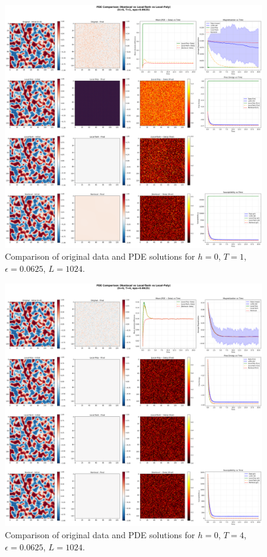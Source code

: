 \documentclass[11pt,a4paper]{article}
\begin{document}

\begin{figure}[!h]
    \centering
    \includegraphics[width=1.0\textwidth]{fig/compare_pde_solvers_L1024_h0_T1_eps0.0625.png}
    \caption{Comparison of original data and PDE solutions for $h=0$, $T=1$, $\epsilon=0.0625$, $L=1024$.}
    \label{fig:pde_comparison_h0_T1_eps0.0625}
\end{figure}

\begin{figure}[!h]
    \centering
    \includegraphics[width=1.0\textwidth]{fig/compare_pde_solvers_L1024_h0_T4_eps0.0625.png}
    \caption{Comparison of original data and PDE solutions for $h=0$, $T=4$, $\epsilon=0.0625$, $L=1024$.}
    \label{fig:pde_comparison_h0_T4_eps0.0625}
\end{figure}
\end{document}
